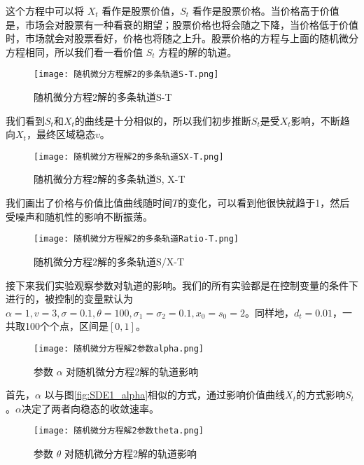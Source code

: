 \documentclass{article}
\begin{document}
这个方程中可以将 $X_t$ 看作是股票价值，$S_t$ 看作是股票价格。当价格高于价值是，市场会对股票有一种看衰的期望；股票价格也将会随之下降，当价格低于价值时，市场就会对股票看好，价格也将随之上升。股票价格的方程与上面的随机微分方程相同，所以我们看一看价值 $S_t$ 方程的解的轨道。



\begin{figure}[H]
    \centering
    \texttt{[image: 随机微分方程解2的多条轨道S-T.png]}
    \caption{随机微分方程2解的多条轨道S-T}
    \label{fig:SDE2_S}
    \end{figure}


我们看到$S_t$和$X_t$的曲线是十分相似的，所以我们初步推断$S_t$是受$X_t$影响，不断趋向$X_t$，最终区域稳态$v$。


\begin{figure}[H]
    \centering
    \texttt{[image: 随机微分方程解2的多条轨道SX-T.png]}
    \caption{随机微分方程2解的多条轨道S, X-T}
    \label{fig:SDE2_SX}
    \end{figure}


我们画出了价格与价值比值曲线随时间$T$的变化，可以看到他很快就趋于1，然后受噪声和随机性的影响不断振荡。

\begin{figure}[H]
    \centering
    \texttt{[image: 随机微分方程解2的多条轨道Ratio-T.png]}
    \caption{随机微分方程2解的多条轨道S/X-T}
    \label{fig:SDE2_Ratio}
    \end{figure}


接下来我们实验观察参数对轨道的影响。我们的所有实验都是在控制变量的条件下进行的，被控制的变量默认为$\alpha=1, v=3, \sigma=0.1, \theta=100, \sigma_1 = \sigma_2 = 0.1, x_0=s_0=2$。同样地，$d_t = 0.01$，一共取100个个点，区间是$[0, 1]$。


\begin{figure}[H]
    \centering
    \texttt{[image: 随机微分方程解2参数alpha.png]}
    \caption{参数 $\alpha$ 对随机微分方程2解的轨道影响}
    \label{fig:SDE12_alpha}
    \end{figure}

首先，$\alpha$ 以与图\ref{fig:SDE1_alpha}相似的方式，通过影响价值曲线$X_t$的方式影响$S_t$。$\alpha$决定了两者向稳态的收敛速率。


\begin{figure}[H]
    \centering
    \texttt{[image: 随机微分方程解2参数theta.png]}
    \caption{参数 $\theta$ 对随机微分方程2解的轨道影响}
    \label{fig:SDE2_theta}
    \end{figure}
\end{document}

